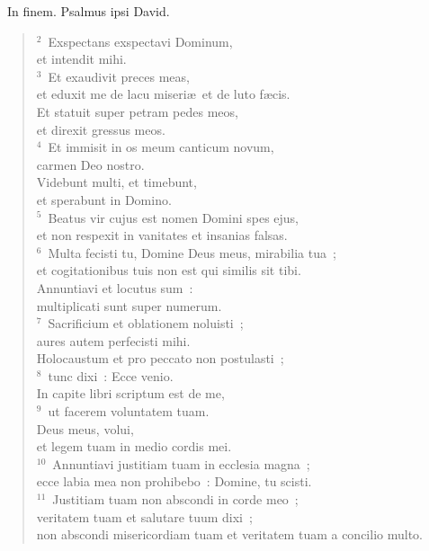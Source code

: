 ~\lettrine[lines=10,image=true,loversize=0.05,lraise=-0.03]{I}{}n finem. Psalmus ipsi David.
\begin{flushleft}\begin{verse}\vspace{6pt}${}^{2}$~Exspectans exspectavi Dominum,\\ et intendit mihi.\\
${}^{3}$~Et exaudivit preces meas,\\ et eduxit me de lacu miseri\ae\ et de luto f\ae cis.\\ Et statuit super petram pedes meos,\\ et direxit gressus meos.\\
${}^{4}$~Et immisit in os meum canticum novum,\\ carmen Deo nostro.\\ Videbunt multi, et timebunt,\\ et sperabunt in Domino.\\
${}^{5}$~Beatus vir cujus est nomen Domini spes ejus,\\ et non respexit in vanitates et insanias falsas.\\
${}^{6}$~Multa fecisti tu, Domine Deus meus, mirabilia tua~;\\ et cogitationibus tuis non est qui similis sit tibi.\\ Annuntiavi et locutus sum~:\\ multiplicati sunt super numerum.\\
${}^{7}$~Sacrificium et oblationem noluisti~;\\ aures autem perfecisti mihi.\\ Holocaustum et pro peccato non postulasti~;\\
${}^{8}$~tunc dixi~: Ecce venio.\\ In capite libri scriptum est de me,\\
${}^{9}$~ut facerem voluntatem tuam.\\ Deus meus, volui,\\ et legem tuam in medio cordis mei.\\
${}^{10}$~Annuntiavi justitiam tuam in ecclesia magna~;\\ ecce labia mea non prohibebo~: Domine, tu scisti.\\
${}^{11}$~Justitiam tuam non abscondi in corde meo~;\\ veritatem tuam et salutare tuum dixi~;\\ non abscondi misericordiam tuam et veritatem tuam a concilio multo.\\

\end{verse}
\end{flushleft}
